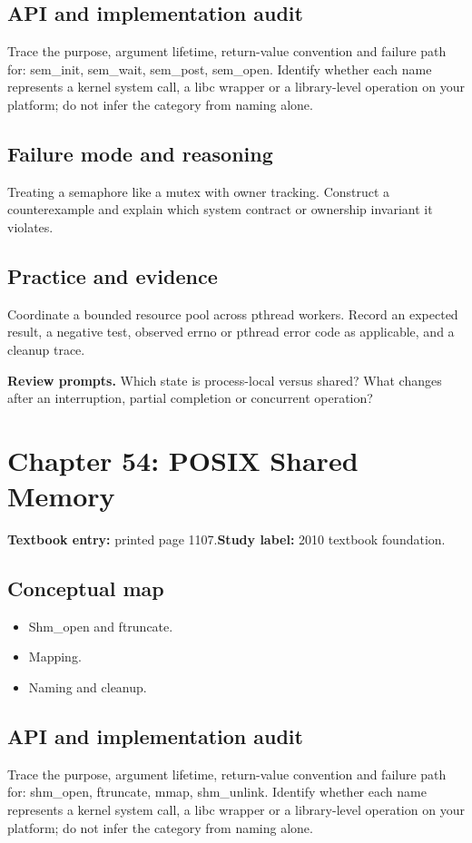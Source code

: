 \documentclass[11pt,letterpaper,oneside]{report}
\begin{document}
\subsection{API and implementation audit}
Trace the purpose, argument lifetime, return-value convention and failure path for: sem\_init, sem\_wait, sem\_post, sem\_open. Identify whether each name represents a kernel system call, a libc wrapper or a library-level operation on your platform; do not infer the category from naming alone.

\subsection{Failure mode and reasoning}
Treating a semaphore like a mutex with owner tracking. Construct a counterexample and explain which system contract or ownership invariant it violates.

\subsection{Practice and evidence}
Coordinate a bounded resource pool across pthread workers. Record an expected result, a negative test, observed errno or pthread error code as applicable, and a cleanup trace.

\textbf{Review prompts.} Which state is process-local versus shared? What changes after an interruption, partial completion or concurrent operation?

\section{Chapter 54: POSIX Shared Memory}
\textbf{Textbook entry:} printed page 1107.\quad \textbf{Study label:} 2010 textbook foundation.

\subsection{Conceptual map}
\begin{itemize}
\item Shm\_open and ftruncate.
\item Mapping.
\item Naming and cleanup.
\end{itemize}
\subsection{API and implementation audit}
Trace the purpose, argument lifetime, return-value convention and failure path for: shm\_open, ftruncate, mmap, shm\_unlink. Identify whether each name represents a kernel system call, a libc wrapper or a library-level operation on your platform; do not infer the category from naming alone.
\end{document}
